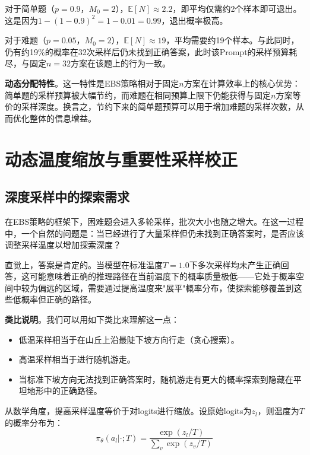 对于简单题（$p = 0.9$，$M_0 = 2$），$\mathbb{E}[N] \approx 2.2$，即平均仅需约2个样本即可退出。这是因为$1 - (1-0.9)^2 = 1 - 0.01 = 0.99$，退出概率极高。

对于难题（$p = 0.05$，$M_0 = 2$），$\mathbb{E}[N] \approx 19$，平均需要约19个样本。与此同时，仍有约19\%的概率在32次采样后仍未找到正确答案，此时该Prompt的采样预算耗尽，与固定$n = 32$方案在该题上的行为一致。

\textbf{动态分配特性}。这一特性是EBS策略相对于固定$n$方案在计算效率上的核心优势：简单题的采样预算被大幅节约，而难题在相同预算上限下仍能获得与固定$n$方案等价的采样深度。换言之，节约下来的简单题预算可以用于增加难题的采样次数，从而优化整体的信息增益。

\section{动态温度缩放与重要性采样校正}
\label{sec:temperature_scaling_is}

\subsection{深度采样中的探索需求}
\label{subsec:exploration_necessity}

在EBS策略的框架下，困难题会进入多轮采样，批次大小也随之增大。在这一过程中，一个自然的问题是：当已经进行了大量采样但仍未找到正确答案时，是否应该调整采样温度以增加探索深度？

直觉上，答案是肯定的。当模型在标准温度$T = 1.0$下多次采样均未产生正确回答，这可能意味着正确的推理路径在当前温度下的概率质量极低——它处于概率空间中较为偏远的区域，需要通过提高温度来"展平"概率分布，使探索能够覆盖到这些低概率但正确的路径。

\textbf{类比说明}。我们可以用如下类比来理解这一点：
\begin{itemize}
    \item 低温采样相当于在山丘上沿最陡下坡方向行走（贪心搜索）。
    \item 高温采样相当于进行随机游走。
    \item 当标准下坡方向无法找到正确答案时，随机游走有更大的概率探索到隐藏在平坦地形中的正确路径。
\end{itemize}

从数学角度，提高采样温度等价于对logits进行缩放。设原始logits为$z_l$，则温度为$T$的概率分布为：
\begin{equation}
\pi_\theta(a_l | \cdot; T) = \frac{\exp(z_l / T)}{\sum_v \exp(z_v / T)}
\label{eq:temperature_distribution}
\end{equation}

